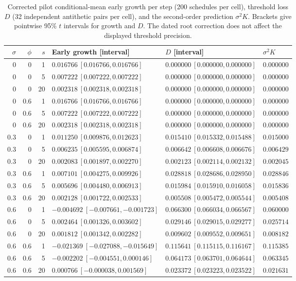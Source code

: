\begin{table}[htbp]
\centering
\small
\setlength{\tabcolsep}{3pt}
\caption{Corrected pilot conditional-mean early growth per step (200 schedules
per cell), threshold loss $D$ (32 independent antithetic pairs per cell),
and the second-order prediction $\sigma^2K$. Brackets give pointwise 95\%
$t$ intervals for growth and $D$. The dated root correction does not affect
the displayed threshold precision.}
\label{num-pilot-growth}
\begin{tabular}{rrrlll}
\toprule
$\sigma$ & $\phi$ & $s$ & Early growth [interval] & $D$ [interval] & $\sigma^2K$ \\
\midrule
0 & 0 & 1 & $0.016766\ [0.016766, 0.016766]$ & $0.000000\ [0.000000, 0.000000]$ & $0.000000$ \\
0 & 0 & 5 & $0.007222\ [0.007222, 0.007222]$ & $0.000000\ [0.000000, 0.000000]$ & $0.000000$ \\
0 & 0 & 20 & $0.002318\ [0.002318, 0.002318]$ & $0.000000\ [0.000000, 0.000000]$ & $0.000000$ \\
0 & 0.6 & 1 & $0.016766\ [0.016766, 0.016766]$ & $0.000000\ [0.000000, 0.000000]$ & $0.000000$ \\
0 & 0.6 & 5 & $0.007222\ [0.007222, 0.007222]$ & $0.000000\ [0.000000, 0.000000]$ & $0.000000$ \\
0 & 0.6 & 20 & $0.002318\ [0.002318, 0.002318]$ & $0.000000\ [0.000000, 0.000000]$ & $0.000000$ \\
0.3 & 0 & 1 & $0.011250\ [0.009876, 0.012623]$ & $0.015410\ [0.015332, 0.015488]$ & $0.015000$ \\
0.3 & 0 & 5 & $0.006235\ [0.005595, 0.006874]$ & $0.006642\ [0.006608, 0.006676]$ & $0.006429$ \\
0.3 & 0 & 20 & $0.002083\ [0.001897, 0.002270]$ & $0.002123\ [0.002114, 0.002132]$ & $0.002045$ \\
0.3 & 0.6 & 1 & $0.007101\ [0.004275, 0.009926]$ & $0.028818\ [0.028686, 0.028950]$ & $0.028846$ \\
0.3 & 0.6 & 5 & $0.005696\ [0.004480, 0.006913]$ & $0.015984\ [0.015910, 0.016058]$ & $0.015836$ \\
0.3 & 0.6 & 20 & $0.002128\ [0.001722, 0.002533]$ & $0.005508\ [0.005472, 0.005544]$ & $0.005408$ \\
0.6 & 0 & 1 & $-0.004692\ [-0.007661, -0.001723]$ & $0.066300\ [0.066034, 0.066567]$ & $0.060000$ \\
0.6 & 0 & 5 & $0.002464\ [0.001326, 0.003602]$ & $0.029146\ [0.029015, 0.029277]$ & $0.025714$ \\
0.6 & 0 & 20 & $0.001812\ [0.001342, 0.002282]$ & $0.009602\ [0.009552, 0.009651]$ & $0.008182$ \\
0.6 & 0.6 & 1 & $-0.021369\ [-0.027088, -0.015649]$ & $0.115641\ [0.115115, 0.116167]$ & $0.115385$ \\
0.6 & 0.6 & 5 & $-0.002202\ [-0.004551, 0.000146]$ & $0.064173\ [0.063701, 0.064644]$ & $0.063345$ \\
0.6 & 0.6 & 20 & $0.000766\ [-0.000038, 0.001569]$ & $0.023372\ [0.023223, 0.023522]$ & $0.021631$ \\
\bottomrule
\end{tabular}
\end{table}


